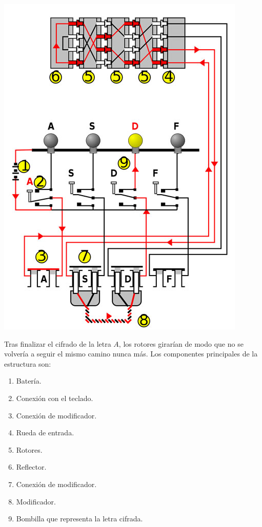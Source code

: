\documentclass[nochap]{apuntesURJC}
\begin{document}
\begin{minipage}{0.5\textwidth}
\begin{center}
\includegraphics[width=\textwidth]{img/enigma.jpg}
\label{fig:enigma}
\end{center}
\end{minipage}
\begin{minipage}{0.45\textwidth}
Tras finalizar el cifrado de la letra $A$, los rotores girarían de modo que no se volvería a seguir el mismo camino nunca más. Los componentes principales de la estructura son:
\begin{enumerate}
\item Batería.
\item Conexión con el teclado.
\item Conexión de modificador.
\item Rueda de entrada.
\item Rotores.
\item Reflector.
\item Conexión de modificador.
\item Modificador.
\item Bombilla que representa la letra cifrada.
\end{enumerate}
\end{minipage}
\end{document}
